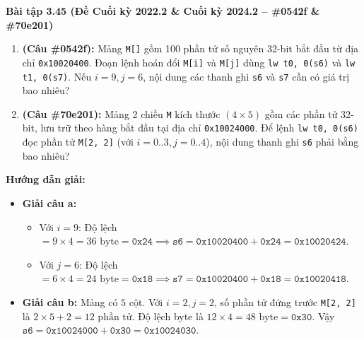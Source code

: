 \textbf{Bài tập 3.45 (Đề Cuối kỳ 2022.2 \& Cuối kỳ 2024.2 -- \#0542f \& \#70e201)}
\begin{enumerate}[label=\alph*)]
    \item \textbf{(Câu \#0542f):} Mảng \texttt{M[]} gồm 100 phần tử số nguyên 32-bit bắt đầu từ địa chỉ \texttt{0x10020400}. Đoạn lệnh hoán đổi \texttt{M[i]} và \texttt{M[j]} dùng \texttt{lw t0, 0(s6)} và \texttt{lw t1, 0(s7)}. Nếu $i = 9, j = 6$, nội dung các thanh ghi \texttt{s6} và \texttt{s7} cần có giá trị bao nhiêu?
    \item \textbf{(Câu \#70e201):} Mảng 2 chiều \texttt{M} kích thước $(4 \times 5)$ gồm các phần tử 32-bit, lưu trữ theo hàng bắt đầu tại địa chỉ \texttt{0x10024000}. Để lệnh \texttt{lw t0, 0(s6)} đọc phần tử \texttt{M[2, 2]} (với $i = 0..3, j = 0..4$), nội dung thanh ghi \texttt{s6} phải bằng bao nhiêu?
\end{enumerate}
\textbf{Hướng dẫn giải:}
\begin{itemize}
    \item \textbf{Giải câu a:}
    \begin{itemize}
        \item Với $i = 9$: Độ lệch $= 9 \times 4 = 36\text{ byte} = \texttt{0x24} \implies \texttt{s6} = \texttt{0x10020400} + \texttt{0x24} = \mathbf{\texttt{0x10020424}}$.
        \item Với $j = 6$: Độ lệch $= 6 \times 4 = 24\text{ byte} = \texttt{0x18} \implies \texttt{s7} = \texttt{0x10020400} + \texttt{0x18} = \mathbf{\texttt{0x10020418}}$.
    \end{itemize}
    \item \textbf{Giải câu b:} Mảng có $5$ cột. Với $i = 2, j = 2$, số phần tử đứng trước \texttt{M[2, 2]} là $2 \times 5 + 2 = 12\text{ phần tử}$. Độ lệch byte là $12 \times 4 = 48\text{ byte} = \texttt{0x30}$. Vậy $\texttt{s6} = \texttt{0x10024000} + \texttt{0x30} = \mathbf{\texttt{0x10024030}}$.
\end{itemize}

